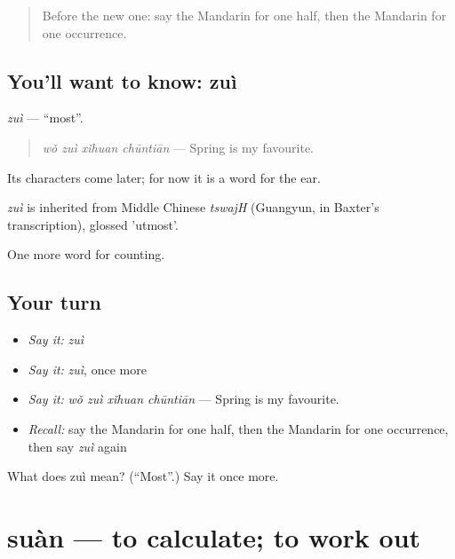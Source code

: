 \label{lesson:ZH-C140-zui}



\begin{quote}
Before the new one: say the Mandarin for one half, then the Mandarin for one occurrence.
\end{quote}

\subsection*{You'll want to know: zuì}
\emph{zuì} — \textquotedblleft{}most\textquotedblright{}.

\begin{quote}
\emph{wǒ zuì xǐhuan chūntiān} — Spring is my favourite.
\end{quote}

Its characters come later; for now it is a word for the ear.

\begin{cousinweb}
\emph{zuì} is inherited from Middle Chinese \emph{tswajH} (Guangyun, in Baxter's transcription), glossed 'utmost'.
\end{cousinweb}

\begin{grammarlens}[title={What you've built}]
One more word for counting.
\end{grammarlens}

\subsection*{Your turn}
\begin{itemize}
\raggedright
  \item \emph{Say it:} \emph{zuì}
  \item \emph{Say it:} \emph{zuì}, once more
  \item \emph{Say it:} \emph{wǒ zuì xǐhuan chūntiān} — Spring is my favourite.
  \item \emph{Recall:} say the Mandarin for one half, then the Mandarin for one occurrence, then say \emph{zuì} again
\end{itemize}

\begin{tcolorbox}[breakable,colback=teal!4,colframe=teal!35!black,title={Before you move on}]
What does zuì mean? (\textquotedblleft{}Most\textquotedblright{}.) Say it once more.
\end{tcolorbox}
\section[suàn]{suàn — to calculate; to work out}

